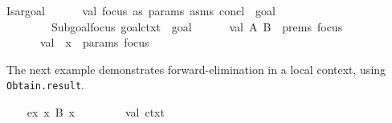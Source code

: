 \begin{isabellebody}
\isaantiq
Isar{}goal{}%
\endisaantiq
{}\isanewline
\ \ \ \ \ \ val\ {}focus\ as\ {}params{}\ asms{}\ concl{}\ {}{}{}{}{}\ goal{}{}\ {}\isanewline
\ \ \ \ \ \ \ \ Subgoal{}focus\ goal{}ctxt\ {}\ goal{}\isanewline
\ \ \ \ \ \ val\ {}A{}\ B{}\ {}\ {}prems\ focus{}\isanewline
\ \ \ \ \ \ val\ {}{}{}{}\ x{}{}\ {}\ {}params\ focus{}\isanewline
\ \ \ \ {}%
\endisatagML
{\isafoldML}%
%
\isadelimML
\isanewline
%
\endisadelimML
%
\isadelimproof
\ \ \ \ %
\endisadelimproof
%
\isatagproof
{}\isamarkupfalse%
%
\endisatagproof
{\isafoldproof}%
%
\isadelimproof
%
\endisadelimproof
%
\begin{isamarkuptext}%
\medskip The next example demonstrates forward-elimination in
  a local context, using \verb|Obtain.result|.%
\end{isamarkuptext}%
\isamarkuptrue%
\isamarkupfalse%
\isanewline
{}\isanewline
%
\isadelimproof
\ \ %
\endisadelimproof
%
\isatagproof
{}\isamarkupfalse%
\ ex{}\ {}{}x{}\ B\ x{}%
\endisatagproof
{\isafoldproof}%
%
\isadelimproof
\isanewline
%
\endisadelimproof
%
\isadelimML
\isanewline
\ \ %
\endisadelimML
%
\isatagML
{}\isamarkupfalse%
\ {}\isanewline
\ \ \ \ val\ ctxt{}\ {}\ %

\end{isabellebody}
